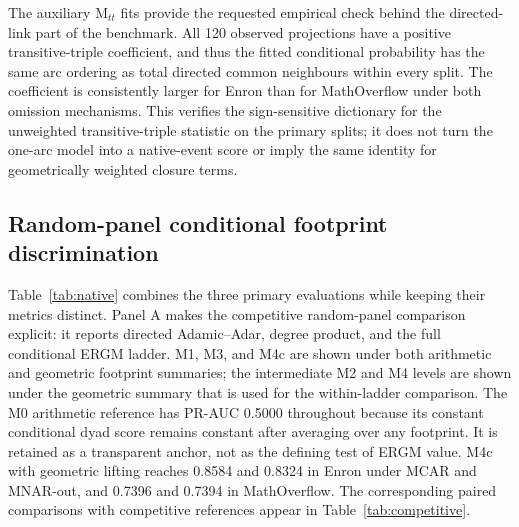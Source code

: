 \documentclass[10pt]{article}
\begin{document}
The auxiliary $\mathrm{M}_{tt}$ fits provide the requested empirical check behind the directed-link part of the benchmark. All 120 observed projections have a positive transitive-triple coefficient, and thus the fitted conditional probability has the same arc ordering as total directed common neighbours within every split. The coefficient is consistently larger for Enron than for MathOverflow under both omission mechanisms. This verifies the sign-sensitive dictionary for the unweighted transitive-triple statistic on the primary splits; it does not turn the one-arc model into a native-event score or imply the same identity for geometrically weighted closure terms.

\subsection{Random-panel conditional footprint discrimination}
Table~\ref{tab:native} combines the three primary evaluations while keeping their metrics distinct. Panel A makes the competitive random-panel comparison explicit: it reports directed Adamic--Adar, degree product, and the full conditional ERGM ladder. M1, M3, and M4c are shown under both arithmetic and geometric footprint summaries; the intermediate M2 and M4 levels are shown under the geometric summary that is used for the within-ladder comparison. The M0 arithmetic reference has PR-AUC 0.5000 throughout because its constant conditional dyad score remains constant after averaging over any footprint. It is retained as a transparent anchor, not as the defining test of ERGM value. M4c with geometric lifting reaches 0.8584 and 0.8324 in Enron under MCAR and MNAR-out, and 0.7396 and 0.7394 in MathOverflow. The corresponding paired comparisons with competitive references appear in Table~\ref{tab:competitive}.
\end{document}
